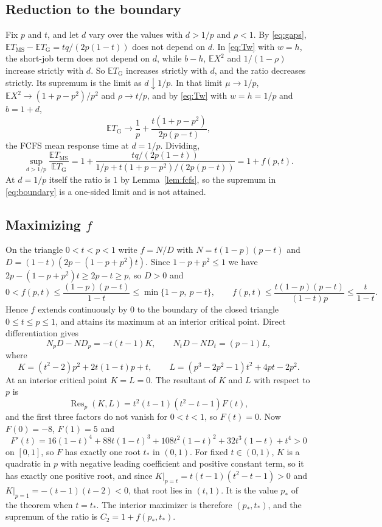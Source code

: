 \documentclass[11pt]{amsart}
\theoremstyle{remark}
\numberwithin{equation}{section}
\newcommand{\E}{\mathbb{E}}
\newcommand{\Res}{\operatorname{Res}}
\begin{document}
\subsection*{Reduction to the boundary}
Fix $p$ and $t$, and let $d$ vary over the values with $d>1/p$ and
$\rho<1$. By \eqref{eq:gaps}, $\E T_{\mathrm{MS}}-\E T_{\mathrm G}
=tq/(2p(1-t))$ does not depend on $d$. In \eqref{eq:Tw} with $w=h$, the
short-job term does not depend on $d$, while $b-h$, $\E X^2$ and
$1/(1-\rho)$ increase strictly with $d$. So $\E T_{\mathrm G}$ increases
strictly with $d$, and the ratio decreases strictly. Its supremum is the
limit as $d\downarrow1/p$. In that limit
$\mu\to1/p$, $\E X^2\to(1+p-p^2)/p^2$ and $\rho\to t/p$, and by
\eqref{eq:Tw} with $w=h=1/p$ and $b=1+d$,
\[
\E T_{\mathrm G}\to\frac1p+\frac{t(1+p-p^2)}{2p(p-t)},
\]
the FCFS mean response time at $d=1/p$. Dividing,
\begin{equation}\label{eq:boundary}
\sup_{d>1/p}\frac{\E T_{\mathrm{MS}}}{\E T_{\mathrm G}}
=1+\frac{tq/(2p(1-t))}{1/p+t(1+p-p^2)/(2p(p-t))}=1+f(p,t).
\end{equation}
At $d=1/p$ itself the ratio is $1$ by Lemma~\ref{lem:fcfs}, so the
supremum in \eqref{eq:boundary} is a one-sided limit and is not attained.

\subsection*{Maximizing \texorpdfstring{$f$}{f}}
On the triangle $0<t<p<1$ write $f=N/D$ with $N=t(1-p)(p-t)$ and
$D=(1-t)(2p-(1-p+p^2)t)$. Since $1-p+p^2\le1$ we have
$2p-(1-p+p^2)t\ge2p-t\ge p$, so $D>0$ and
\[
0<f(p,t)\le\frac{(1-p)(p-t)}{1-t}\le\min\{1-p,\ p-t\},\qquad
f(p,t)\le\frac{t(1-p)(p-t)}{(1-t)p}\le\frac{t}{1-t}.
\]
Hence $f$ extends continuously by $0$ to the boundary of the closed
triangle $0\le t\le p\le1$, and attains its maximum at an interior
critical point. Direct differentiation gives
\[
N_pD-ND_p=-t(t-1)K,\qquad N_tD-ND_t=(p-1)L,
\]
where
\[
K=(t^2-2)p^2+2t(1-t)p+t,\qquad L=(p^3-2p^2-1)t^2+4pt-2p^2 .
\]
At an interior critical point $K=L=0$. The resultant of $K$ and $L$ with
respect to $p$ is
\begin{equation}\label{eq:res}
\Res_p(K,L)=t^2(t-1)(t^2-t-1)F(t),
\end{equation}
and the first three factors do not vanish for $0<t<1$, so $F(t)=0$. Now
$F(0)=-8$, $F(1)=5$ and
\[
F'(t)=16(1-t)^4+88t(1-t)^3+108t^2(1-t)^2+32t^3(1-t)+t^4>0
\]
on $[0,1]$, so $F$ has exactly one root $t_*$ in $(0,1)$. For fixed
$t\in(0,1)$, $K$ is a quadratic in $p$ with negative leading coefficient
and positive constant term, so it has exactly one positive root, and since
$K|_{p=t}=t(t-1)(t^2-t-1)>0$ and $K|_{p=1}=-(t-1)(t-2)<0$, that root lies in
$(t,1)$. It is the value $p_*$ of the theorem when $t=t_*$. The interior
maximizer is therefore $(p_*,t_*)$, and the supremum of the ratio is
$C_2=1+f(p_*,t_*)$.
\end{document}
